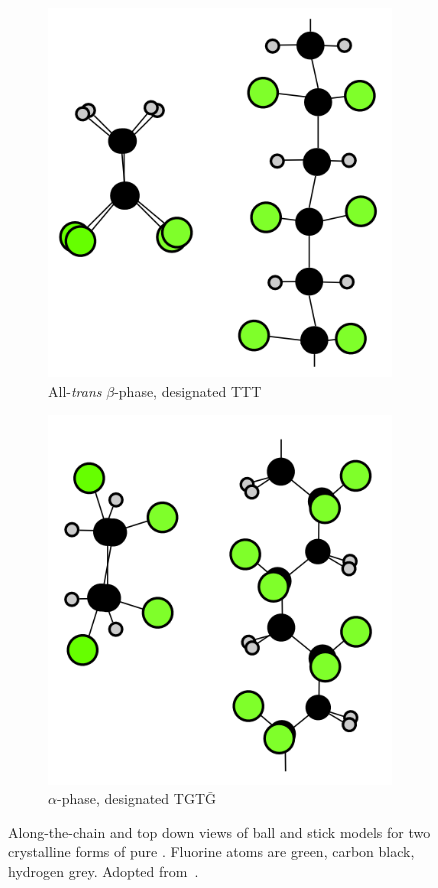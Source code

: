 \begin{figure}
\begin{subfigure}{0.5\textwidth}
\centering
	\includegraphics[width=0.8\linewidth]{./figs/chap1/pvdfbeta}
	\caption{All-\emph{trans} $\beta$-phase, designated TTT}
	\label{fig:pvdfbeta}
\end{subfigure}
\begin{subfigure}{0.5\textwidth}
\centering
	\includegraphics[width=0.8\linewidth]{./figs/chap1/pvdfalpha}
	\caption{$\alpha$-phase, designated TGT$\bar{\text{G}}$}
	\label{fig:pvdfalpha}
\end{subfigure}
\caption[Along-the-chain and top down views of ball and stick models for two crystalline forms of pure \pvdf{}. Fluorine atoms are green, carbon black, hydrogen grey.]{Along-the-chain and top down views of ball and stick models for two crystalline forms of pure \pvdf{}. Fluorine atoms are green, carbon black, hydrogen grey. Adopted from~\cite[p. 809]{encyclopedia}.}
\label{fig:pvdfstruct}
\end{figure}
